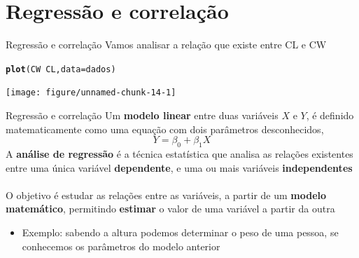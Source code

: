 \documentclass[10pt]{beamer}\usepackage[]{graphicx}\usepackage[]{color}
\makeatletter
\newcommand{\hlopt}[1]{\textcolor[rgb]{0,0,0}{#1}}%
\newcommand{\hlstd}[1]{\textcolor[rgb]{0.345,0.345,0.345}{#1}}%
\newcommand{\hlkwc}[1]{\textcolor[rgb]{0.333,0.667,0.333}{#1}}%
\newcommand{\hlkwd}[1]{\textcolor[rgb]{0.737,0.353,0.396}{\textbf{#1}}}%
\newenvironment{kframe}{%
 \def\at@end@of@kframe{}%
 \ifinner\ifhmode%
  \def\at@end@of@kframe{\end{minipage}}%
  \begin{minipage}{\columnwidth}%
 \fi\fi%
 \def\FrameCommand##1{\hskip\@totalleftmargin \hskip-\fboxsep
 \colorbox{shadecolor}{##1}\hskip-\fboxsep
     \hskip-\linewidth \hskip-\@totalleftmargin \hskip\columnwidth}%
 \MakeFramed {\advance\hsize-\width
   \@totalleftmargin\z@ \linewidth\hsize
   \@setminipage}}%
 {\par\unskip\endMakeFramed%
 \at@end@of@kframe}
\newenvironment{knitrout}{}{} %
\theoremstyle{definition}
\makeatother
\begin{document}
\section{Regressão e correlação}

\begin{frame}[fragile=singleslide]{Regressão e correlação}
Vamos analisar a relação que existe entre CL e CW
\begin{knitrout}\small
{}\color{fgcolor}\begin{kframe}
\begin{alltt}
\hlkwd{plot}\hlstd{(CW} \hlopt{~} \hlstd{CL,} \hlkwc{data} \hlstd{= dados)}
\end{alltt}
\end{kframe}

{\centering \texttt{[image: figure/unnamed-chunk-14-1]} 

}



\end{knitrout}
\end{frame}

\begin{frame}[fragile]{Regressão e correlação}
  Um \textbf{modelo linear} entre duas variáveis $X$ e $Y$, é definido
  matematicamente como uma equação com dois parâmetros desconhecidos,
  \begin{equation*}
    Y = \beta_0 + \beta_1 X
  \end{equation*}
  A \textbf{análise de regressão} é a técnica estatística que analisa as
  relações existentes entre uma única variável \textbf{dependente}, e
  uma ou mais variáveis \textbf{independentes} \\~\\
  O objetivo é estudar as relações entre as variáveis, a partir de um
  \textbf{modelo matemático}, permitindo \textbf{estimar} o valor de uma
  variável a partir da outra
  \begin{itemize}
  \item Exemplo: sabendo a altura podemos determinar o peso de uma
    pessoa, se conhecemos os parâmetros do modelo anterior
  \end{itemize}
\end{frame}
\end{document}
